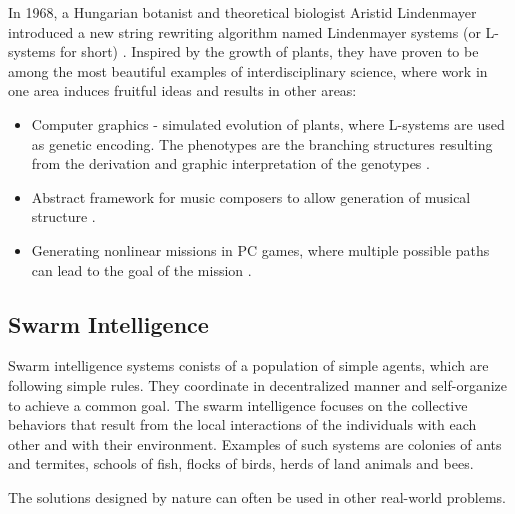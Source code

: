 In 1968, a Hungarian botanist and theoretical biologist Aristid Lindenmayer introduced a new string rewriting algorithm named Lindenmayer systems (or  L-systems for short) \cite{Lindenmayer68, Rozenberg12Lindenmayer}. Inspired by the growth of plants, they have proven to be among the most beautiful examples of interdisciplinary science, where work in one area induces fruitful ideas and results in other areas:
\begin{itemize}
  \item Computer graphics - simulated evolution of plants, where L-systems are used as genetic encoding. The phenotypes are the branching structures resulting from the derivation and graphic interpretation of the genotypes \cite{Ochoa98GeneticLSystems}.
  \item Abstract framework for music composers to allow generation of musical structure \cite{Manousakis06MusicalLSystems}.
  \item Generating nonlinear missions in PC games, where multiple possible paths can lead to the goal of the mission \cite{Togelius2016LSystemsLevels}.
\end{itemize}


\subsection{Swarm Intelligence} %
\label{sub:swarm_intelligence}

Swarm intelligence  systems conists of a population of simple agents, which are following simple rules. They coordinate in decentralized manner and self-organize to achieve a common goal. The swarm intelligence focuses on the collective behaviors that result from the local interactions of the individuals with each other and with their environment. Examples of such systems are colonies of ants and termites, schools of fish, flocks of birds, herds of land animals and bees.

The solutions designed by nature can often be used in other real-world problems.

